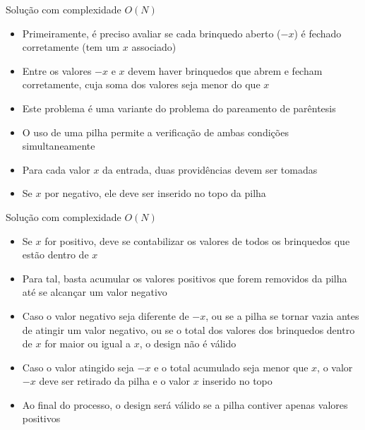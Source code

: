 \begin{frame}[fragile]{Solução com complexidade $O(N)$}

    \begin{itemize}
        \item Primeiramente, é preciso avaliar se cada brinquedo aberto ($-x$) é fechado
            corretamente (tem um $x$ associado)

        \item Entre os valores $-x$ e $x$ devem haver brinquedos que abrem e fecham corretamente,
            cuja soma dos valores seja menor do que $x$

        \item Este problema é uma variante do problema do pareamento de parêntesis

        \item O uso de uma pilha permite a verificação de ambas condições simultaneamente

        \item Para cada valor $x$ da entrada, duas providências devem ser tomadas

        \item Se $x$ por negativo, ele deve ser inserido no topo da pilha
   \end{itemize}

\end{frame}

\begin{frame}[fragile]{Solução com complexidade $O(N)$}

    \begin{itemize}
        \item Se $x$ for positivo, deve se contabilizar os valores de todos os brinquedos que
            estão dentro de $x$

        \item Para tal, basta acumular os valores positivos que forem removidos da pilha até
            se alcançar um valor negativo

        \item Caso o valor negativo seja diferente de $-x$, ou se a pilha se tornar vazia antes
            de atingir um valor negativo, ou se o total dos valores dos brinquedos dentro de $x$
            for maior ou igual a $x$, o design não é válido

        \item Caso o valor atingido seja $-x$ e o total acumulado seja menor que $x$, o valor
            $-x$ deve ser retirado da pilha e o valor $x$ inserido no topo

        \item Ao final do processo, o design será válido se a pilha contiver apenas valores
            positivos
    \end{itemize}

\end{frame}

